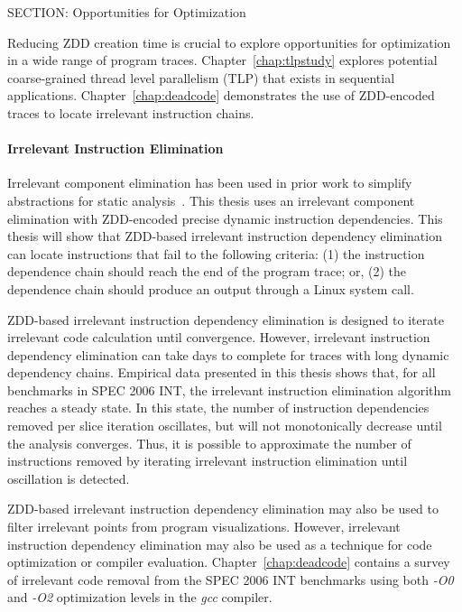 {SECTION: Opportunities for Optimization


Reducing ZDD creation time is crucial to explore opportunities for optimization in a wide range of program traces. Chapter~\ref{chap:tlpstudy} explores potential coarse-grained thread level parallelism (TLP) that exists in sequential applications. Chapter~\ref{chap:deadcode} demonstrates the use of ZDD-encoded traces to locate irrelevant instruction chains.

\noindent\paragraph{Irrelevant Instruction Elimination}

Irrelevant component elimination has been used in prior work to simplify abstractions for static analysis~\cite{corbett:icsc:2000}. This thesis uses an irrelevant component elimination with ZDD-encoded precise dynamic instruction dependencies.  This thesis will show that ZDD-based irrelevant instruction dependency elimination can locate instructions that fail to the following criteria: (1) the instruction dependence chain should reach the end of the program trace; or, (2) the dependence chain should produce an output through a Linux system call.

ZDD-based irrelevant instruction dependency elimination is designed to iterate irrelevant code calculation until convergence.  However, irrelevant instruction dependency elimination can take days to complete for traces with long dynamic dependency chains. Empirical data presented in this thesis shows that, for all benchmarks in SPEC 2006 INT, the irrelevant instruction elimination algorithm reaches a steady state.  In this state, the number of instruction dependencies removed per slice iteration oscillates, but will not monotonically decrease until the analysis converges.  Thus, it is possible to approximate the number of instructions removed by iterating irrelevant instruction elimination until oscillation is detected.

ZDD-based irrelevant instruction dependency elimination may also be used to filter irrelevant points from program visualizations. However, irrelevant instruction dependency elimination may also be used as a technique for code optimization or compiler evaluation. Chapter~\ref{chap:deadcode} contains a survey of irrelevant code removal from the SPEC 2006 INT benchmarks using both \textit{-O0} and \textit{-O2} optimization levels in the \textit{gcc} compiler.

}

